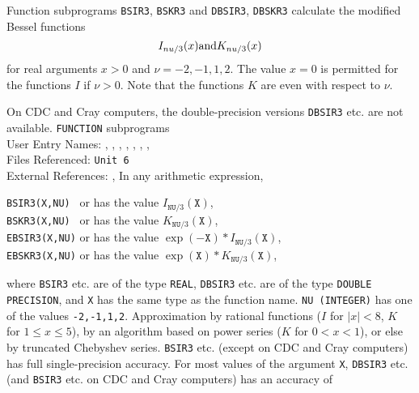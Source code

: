                         
                  
\Submitter{ }                           
                      
Function subprograms {\tt BSIR3}, {\tt BSKR3}
and {\tt DBSIR3}, {\tt DBSKR3}
calculate the modified Bessel functions
$$ I_{\nu/3}(x)\mbox{\quad and\quad}K_{\nu/3}(x)$$
for real arguments $x>0$
and $\nu = -2,-1,1,2$. The value $x=0$
is permitted for the functions $I$ if $\nu > 0$.
Note that the functions $K$ are even with respect to $\nu$.
\par
On CDC and Cray computers, the double-precision versions
{\tt DBSIR3} etc. are not available.
\Structure
{\tt FUNCTION} subprograms \\
User Entry Names:
, , , ,
, , , \\
Files Referenced: {\tt Unit 6} \\
External References: , 
\Usage
In any arithmetic expression,
\begin{center}
\parbox{.8\textwidth}{
{\tt BSIR3(X,NU)\ } \quad or 
\quad has the value \quad $I_{\mathtt{NU}/3}(\mathtt{X})$, \\
{\tt BSKR3(X,NU)\ } \quad or 
\quad has the value \quad $K_{\mathtt{NU}/3}(\mathtt{X})$, \\
{\tt EBSIR3(X,NU)} \quad or 
\quad has the value \quad
$\exp(-\mathtt{X}) * I_{\mathtt{NU}/3}(\mathtt{X})$, \\
{\tt EBSKR3(X,NU)} \quad or 
\quad has the value \quad
$\exp(\mathtt{X}) * K_{\mathtt{NU}/3}(\mathtt{X})$,
}\end{center}
where {\tt BSIR3} etc. are of the type
{\tt REAL}, {\tt DBSIR3} etc. are of
the type {\tt DOUBLE PRECISION},
and {\tt X} has the same type as the function name.
{\tt NU (INTEGER)} has one of the values {\tt -2,-1,1,2}.
\Method
Approximation by rational functions ($I$ for $|x|<8$, $K$ for
$1 \le x \le 5$), by an algorithm based on power series ($K$ for
$0 < x < 1$), or else by truncated Chebyshev series.
\Accuracy
{\tt BSIR3} etc. (except on CDC and Cray computers)
has full single-precision accuracy.
For most values of the argument {\tt X}, {\tt DBSIR3} etc.
(and {\tt BSIR3} etc. on CDC and Cray computers) has an accuracy of
